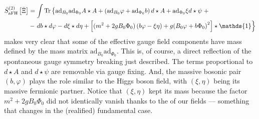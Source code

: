 \documentclass[../main.tex]{subfiles}
\begin{document}
\begin{align}%
  \label{eq:afh-eff-quad-action}
  \bar{S}_{\text{aFH}}^{(2)} \left[ \bar{\Xi} \right] & = \int \tr \left\{ \vphantom{m^2} \mathrm{ad}_{B_0} \mathrm{ad}_{\Phi_0} A \star A + \left( \mathrm{ad}_{B_0} \varphi + \mathrm{ad}_{\Phi_0} b \right) d \star A + \mathrm{ad}_{\Phi_0} \xi d \star \psi \right. +  \nonumber \\
                                                      & - \left. db \star d\varphi - d\xi \star d\eta +\left[ ( m^2 + 2g B_0 \Phi_0 ) \left( b \varphi - \xi \eta \right) + g {\left( B_0 \varphi + b \Phi_0 \right)}^2 \right] \star \mathds{1} \right\}
\end{align}
makes very clear that some of the effective gauge field components have mass defined by the mass matrix $\mathrm{ad}_{B_0}\mathrm{ad}_{\Phi_0}$. This is, of course, a direct reflection of the spontaneous gauge symmetry breaking just described. The terms proportional to $d \star A$ and $d \star \psi$ are removable via gauge fixing. And, the massive bosonic pair $(b, \varphi)$ plays the role similar to the Higgs boson field, with $(\xi,\eta)$ being its massive fermionic partner. Notice that $(\xi,\eta)$ kept its mass because the factor $m^2+2gB_0\Phi_0$ did not identically vanish thanks to the  of our fields --- something that changes in the (realified) fundamental case.
\end{document}
